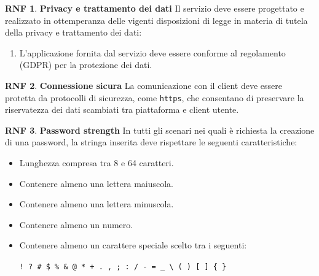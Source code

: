 \documentclass[11pt, a4paper]{article}
\theoremstyle{definition}
\newtheorem{nonfuncreq}{RNF} %
\begin{document}
\begin{nonfuncreq}
\textbf{Privacy e trattamento dei dati }
Il servizio deve essere progettato e realizzato in ottemperanza delle
vigenti disposizioni di legge in materia di tutela della privacy e
trattamento dei dati:
\begin{enumerate}
    \item L'applicazione fornita dal servizio deve essere conforme
    al regolamento \href{https://www.garanteprivacy.it/documents/10160/0/Regolamento+UE+2016+679.+Arricchito+con+riferimenti+ai+Considerando+Aggiornato+alle+rettifiche+pubblicate+sulla+Gazzetta+Ufficiale++dell%27Unione+europea+127+del+23+maggio+2018}{\textcolor{blue}{\underbar{UE n.2016/679}}} (GDPR) per la protezione dei dati.
\end{enumerate}
\end{nonfuncreq}

\begin{nonfuncreq}
\textbf{Connessione sicura }
La comunicazione con il client deve essere protetta da protocolli
di sicurezza, come \texttt{https}, che consentano di preservare la
riservatezza dei dati scambiati tra piattaforma e client utente.
\end{nonfuncreq}

\begin{nonfuncreq}
\label{legalpassword}
\textbf{Password strength }
In tutti gli scenari nei quali è richiesta la creazione di una password,
la stringa inserita deve rispettare le seguenti caratteristiche:
\begin{itemize}
    \item Lunghezza compresa tra 8 e 64 caratteri.
    \item Contenere almeno una lettera maiuscola.
    \item Contenere almeno una lettera minuscola.
    \item Contenere almeno un numero.
    \item Contenere almeno un carattere speciale scelto tra i
    seguenti:
    \begin{center}
        \verb|! ? # $ % & @ * + . , ; : / - = _ \ ( ) [ ] { }|
    \end{center}
\end{itemize}
\end{nonfuncreq}

\end{document}
